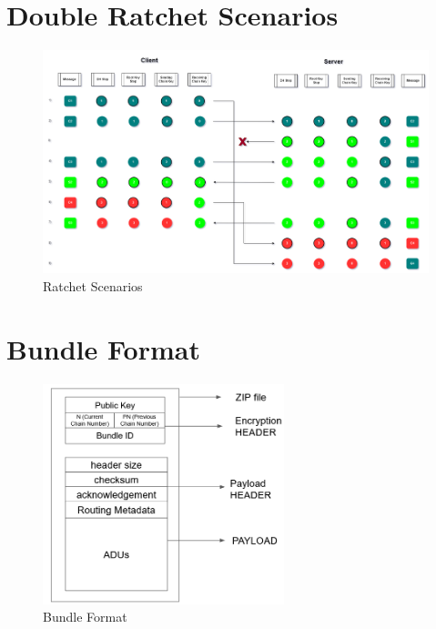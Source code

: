\section{Double Ratchet Scenarios}
\begin{figure}[ht!]
\centering
\includegraphics[width= 150mm]{./images/Ratchet Scenarios.png}
\caption{Ratchet Scenarios}
\end{figure}


\section{Bundle Format}
\begin{figure}[ht!]
\centering
\includegraphics[width= 70mm]{./images/Bundle Header.png}
\caption{Bundle Format}
\end{figure}

